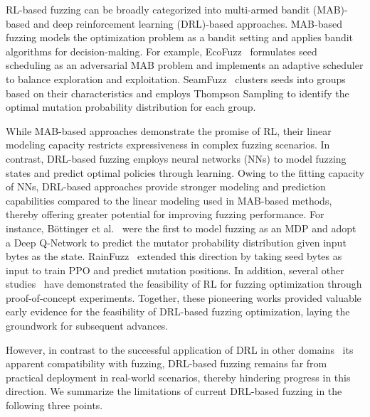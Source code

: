 \documentclass[lettersize,journal]{IEEEtran}
\begin{document}
RL-based fuzzing can be broadly categorized into multi-armed bandit (MAB)-based and deep reinforcement learning (DRL)-based approaches. MAB-based fuzzing models the optimization problem as a bandit setting and applies bandit algorithms for decision-making. For example, EcoFuzz~\cite{yueEcoFuzzAdaptiveEnergysaving2020} formulates seed scheduling as an adversarial MAB problem and implements an adaptive scheduler to balance exploration and exploitation. SeamFuzz~\cite{leeLearningSeedadaptiveMutation2023} clusters seeds into groups based on their characteristics and employs Thompson Sampling to identify the optimal mutation probability distribution for each group.

While MAB-based approaches demonstrate the promise of RL, their linear modeling capacity restricts expressiveness in complex fuzzing scenarios\cite{cutkoskyDynamicBalancingModel2021}. In contrast, DRL-based fuzzing employs neural networks (NNs) to model fuzzing states and predict optimal policies through learning. Owing to the fitting capacity of NNs, DRL-based approaches provide stronger modeling and prediction capabilities compared to the linear modeling used in MAB-based methods, thereby offering greater potential for improving fuzzing performance. For instance, Böttinger et al.~\cite{bottingerDeepReinforcementFuzzing2018} were the first to model fuzzing as an MDP and adopt a Deep Q-Network to predict the mutator probability distribution given input bytes as the state. RainFuzz~\cite{binosiRainfuzzReinforcementlearningDriven2023} extended this direction by taking seed bytes as input to train PPO and predict mutation positions. In addition, several other studies~\cite{gongDRLFCfuzzerFuzzingDeepReinforcementLearning2022,jeonDrPathFinderHybrid2022,liangRLFDirectedFuzzing2022,liuXRLFuzzFuzzingBinaries2024} have demonstrated the feasibility of RL for fuzzing optimization through proof-of-concept experiments. Together, these pioneering works provided valuable early evidence for the feasibility of DRL-based fuzzing optimization, laying the groundwork for subsequent advances.

However, in contrast to the successful application of DRL in other domains~\cite{zhaoSurveyRecentAdvancements2024,tangDeepReinforcementLearning2025,silverMasteringChessShogi2017} its apparent compatibility with fuzzing, DRL-based fuzzing remains far from practical deployment in real-world scenarios, thereby hindering progress in this direction. We summarize the limitations of current DRL-based fuzzing in the following three points.
\end{document}
